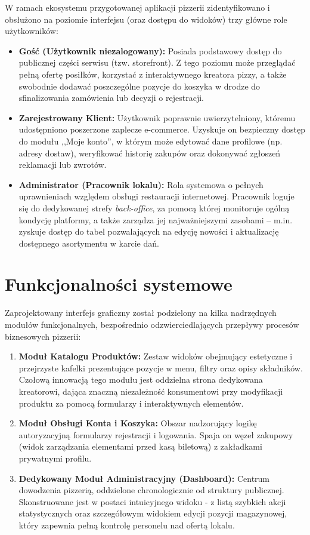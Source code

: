 W ramach ekosystemu przygotowanej aplikacji pizzerii zidentyfikowano i obsłużono na poziomie interfejsu (oraz dostępu do widoków) trzy główne role użytkowników:
\begin{itemize}
    \item \textbf{Gość (Użytkownik niezalogowany):} Posiada podstawowy dostęp do publicznej części serwisu (tzw. storefront). Z tego poziomu może przeglądać pełną ofertę posiłków, korzystać z interaktywnego kreatora pizzy, a także swobodnie dodawać poszczególne pozycje do koszyka w drodze do sfinalizowania zamówienia lub decyzji o rejestracji.
    \item \textbf{Zarejestrowany Klient:} Użytkownik poprawnie uwierzytelniony, któremu udostępniono poszerzone zaplecze e-commerce. Uzyskuje on bezpieczny dostęp do modułu ,,Moje konto'', w którym może edytować dane profilowe (np. adresy dostaw), weryfikować historię zakupów oraz dokonywać zgłoszeń reklamacji lub zwrotów.
    \item \textbf{Administrator (Pracownik lokalu):} Rola systemowa o pełnych uprawnieniach względem obsługi restauracji internetowej. Pracownik loguje się do dedykowanej strefy \textit{back-office}, za pomocą której monitoruje ogólną kondycję platformy, a także zarządza jej najważniejszymi zasobami -- m.in. zyskuje dostęp do tabel pozwalających na edycję nowości i aktualizację dostępnego asortymentu w karcie dań.
\end{itemize}

\section{Funkcjonalności systemowe}

Zaprojektowany interfejs graficzny został podzielony na kilka nadrzędnych modułów funkcjonalnych, bezpośrednio odzwierciedlających przepływy procesów biznesowych pizzerii:
\begin{enumerate}
    \item \textbf{Moduł Katalogu Produktów:} Zestaw widoków obejmujący estetyczne i przejrzyste kafelki prezentujące pozycje w menu, filtry oraz opisy składników. Czołową innowacją tego modułu jest oddzielna strona dedykowana kreatorowi, dająca znaczną niezależność konsumentowi przy modyfikacji produktu za pomocą formularzy i interaktywnych elementów.
    \item \textbf{Moduł Obsługi Konta i Koszyka:} Obszar nadzorujący logikę autoryzacyjną formularzy rejestracji i logowania. Spaja on węzeł zakupowy (widok zarządzania elementami przed kasą biletową) z zakładkami prywatnymi profilu.
    \item \textbf{Dedykowany Moduł Administracyjny (Dashboard):} Centrum dowodzenia pizzerią, oddzielone chronologicznie od struktury publicznej. Skonstruowane jest w postaci intuicyjnego widoku - z listą szybkich akcji statystycznych oraz szczegółowym widokiem edycji pozycji magazynowej, który zapewnia pełną kontrolę personelu nad ofertą lokalu.
\end{enumerate}


